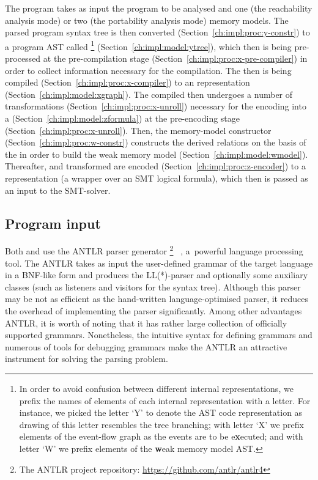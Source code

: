 The program takes as input the program to be analysed and one (the reachability analysis mode) or two (the portability analysis mode) memory models. The parsed program syntax tree is then converted (Section~\ref{ch:impl:proc:y-constr}) to a program AST called \ytree{}%
\footnote{In order to avoid confusion between different internal representations, we prefix the names of elements of each internal representation with a letter. For instance, we picked the letter `Y' to denote the AST code representation as drawing of this letter resembles the tree branching; with letter `X' we prefix elements of the event-flow graph as the events are to be e\textbf{x}ecuted; and with letter `W' we prefix elements of the \textbf{w}eak memory model AST.}%
(Section~\ref{ch:impl:model:ytree}), which then is being pre-processed at the pre-compilation stage (Section~\ref{ch:impl:proc:x-pre-compiler}) in order to collect information necessary for the compilation.
The \ytree{} then is being compiled (Section~\ref{ch:impl:proc:x-compiler}) to an \xgraph{} representation (Section~\ref{ch:impl:model:xgraph}).
The compiled \xgraph{} then undergoes a number of transformations (Section~\ref{ch:impl:proc:x-unroll}) necessary for the encoding into a \zformula{} (Section~\ref{ch:impl:model:zformula}) at the pre-encoding stage (Section~\ref{ch:impl:proc:x-unroll}).
Then, the memory-model constructor (Section~\ref{ch:impl:proc:w-constr}) constructs the derived relations on the basis of the \xgraph{} in order to build the weak memory model \wmodel{} (Section~\ref{ch:impl:model:wmodel}).
Thereafter, \wmodel{} and transformed \xgraph{} are encoded (Section~\ref{ch:impl:proc:z-encoder}) to a \zformula{} representation (a wrapper over an SMT logical formula), which then is passed as an input to the SMT-solver.

\subsection{Program input}
\label{ch:impl:input}

Both \porthos[1] and \porthos[2] use the ANTLR parser generator%
\footnote{The ANTLR project repository: \url{https://github.com/antlr/antlr4}}%
~\cite{parr2013definitive}, a~powerful language processing tool.
The ANTLR takes as input the user-defined grammar of the target language in a BNF-like form and produces the LL(*)-parser and optionally some auxiliary classes (such as listeners and visitors for the syntax tree).
Although this parser may be not as efficient as the hand-written language-optimised parser, it reduces the overhead of implementing the parser significantly.
Among other advantages ANTLR, it is worth of noting that it has rather large collection of officially supported grammars. Nonetheless, the intuitive syntax for defining grammars and numerous of tools for debugging grammars make the ANTLR an attractive instrument for solving the parsing problem.

